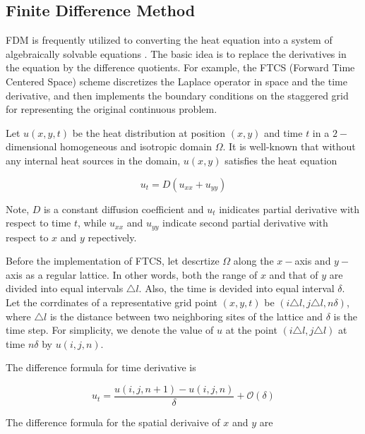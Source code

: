 
\subsection{Finite Difference Method}

FDM is frequently utilized to converting the heat equation into a
system of algebraically solvable equations
\cite{grossmann2007numerical}. The basic idea is to replace the
derivatives in the equation by the difference quotients. For example,
the FTCS (Forward Time Centered Space) scheme
\cite{pletcher2012computational} discretizes the Laplace operator in
space and the time derivative, and then implements the boundary
conditions on the staggered grid for representing the original
continuous problem.


Let $u(x, y, t)$ be the heat distribution at position $(x, y)$ and
time $t$ in a $2-$dimensional homogeneous and isotropic domain $\Omega$. It is
well-known that without any internal heat sources in the domain, $u(x,
y)$ satisfies the heat equation

\begin{equation}\label{eq:Cartesian_heat_equation}
  u_t = D (u_{xx} + u_{yy})
\end{equation}

Note, $D$ is a constant diffusion coefficient and $u_t$ inidicates
partial derivative with respect to time $t$, while $u_{xx}$ and
$u_{yy}$ indicate second partial derivative with respect to $x$ and
$y$ repectively.

Before the implementation of FTCS, let descrtize $\Omega$ along the
$x-$axis and $y-$axis as a regular lattice. In other words, both the
range of $x$ and that of $y$ are divided into equal intervals
$\triangle l$. Also, the time is devided into equal interval
$\delta$. Let the corrdinates of a representative grid point $(x, y,
t)$ be $(i \triangle l, j \triangle l, n \delta)$, where $\triangle l$
is the distance between two neighboring sites of the lattice and
$\delta$ is the time step. For simplicity, we denote the value of $u$
at the point $(i \triangle l, j \triangle l)$ at time $n \delta$ by
$u(i, j, n)$.

The difference formula for time derivative is

\begin{equation}\label{eq:time_difference}
  u_t = \frac{u(i, j, n+1) - u(i, j, n)}{\delta} + \mathcal{O}(\delta)
\end{equation}

The difference formula for the spatial derivaive of $x$ and $y$ are

